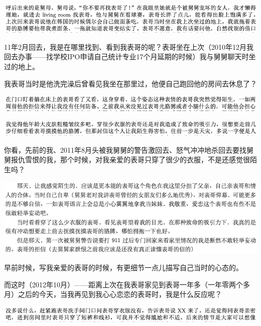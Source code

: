 \documentclass[9pt, b5paper]{article}
\begin{document}
\begin{center}
\includegraphics[width=.9\linewidth]{./pic/backups_plans_20210502_105754.png}
\end{center}

11年2月回去，我是在哪里找到、看到我表哥的呢？表哥坐在上次（2010年12月我回去办事——找学校IPO申请自己统计专业17个月延期的时候）我与舅舅聊天时坐过的地上。

我表哥当时是他洗完澡后曾看见我坐在那里过，他便自己跑回他的房间去休息了？

\begin{center}
\includegraphics[width=.9\linewidth]{./pic/backups_plans_20210502_110750.png}
\end{center}

\begin{center}
\includegraphics[width=.9\linewidth]{./pic/backups_plans_20210502_110807.png}
\end{center}

你看，先前的我、2011年8月头被我舅舅的警告激回去、怒气冲冲地杀回去要找舅舅报仇雪恨的我，那个时候，对我亲爱的表哥只穿了很少的衣服，不是还感觉很陌生吗？

\begin{center}
\includegraphics[width=.9\linewidth]{./pic/backups_plans_20210502_110919.png}
\end{center}

早前时候，写我亲爱的表哥的时候，有更细节一点儿描写自己当时的心态的。

而这时（2012年10月）——距离上次在我表哥家见到表哥一年多（一年零两个多月）之后的今天，当我再见到我心心恋恋的表哥时，我是什么反应呢？

\begin{center}
\includegraphics[width=.9\linewidth]{./pic/backups_plans_20210502_112215.png}
\end{center}
\end{document}
